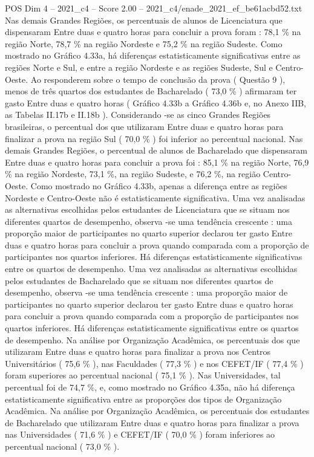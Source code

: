 \begin{textsample}{POS Dim 4 – 2021\_c4 – Score 2.00 – 2021\_c4/enade\_2021\_ef\_be61acbd52.txt}
Nas demais Grandes Regiões, os percentuais de alunos de Licenciatura que dispensaram Entre duas e quatro horas para concluir a prova foram : 78,1 \% na região Norte, 78,7 \% na região Nordeste e 75,2 \% na região Sudeste.
Como mostrado no Gráfico 4.33a, há diferenças estatisticamente significativas entre as regiões Norte e Sul, e entre a região Nordeste e as regiões Sudeste, Sul e Centro-Oeste.
Ao responderem sobre o tempo de conclusão da prova ( Questão 9 ), menos de três quartos dos estudantes de Bacharelado ( 73,0 \% ) afirmaram ter gasto Entre duas e quatro horas ( Gráfico 4.33b a Gráfico 4.36b e, no Anexo IIB, as Tabelas II.17b e II.18b ).
Considerando -se as cinco Grandes Regiões brasileiras, o percentual dos que utilizaram Entre duas e quatro horas para finalizar a prova na região Sul ( 70,0 \% ) foi inferior ao percentual nacional.
Nas demais Grandes Regiões, o percentual de alunos de Bacharelado que dispensaram Entre duas e quatro horas para concluir a prova foi : 85,1 \% na região Norte, 76,9 \% na região Nordeste, 73,1 \%, na região Sudeste, e 76,2 \%, na região Centro-Oeste.
Como mostrado no Gráfico 4.33b, apenas a diferença entre as regiões Nordeste e Centro-Oeste não é estatisticamente significativa.
Uma vez analisadas as alternativas escolhidas pelos estudantes de Licenciatura que se situam nos diferentes quartos de desempenho, observa -se uma tendência crescente : uma proporção maior de participantes no quarto superior declarou ter gasto Entre duas e quatro horas para concluir a prova quando comparada com a proporção de participantes nos quartos inferiores.
Há diferenças estatisticamente significativas entre os quartos de desempenho.
Uma vez analisadas as alternativas escolhidas pelos estudantes de Bacharelado que se situam nos diferentes quartos de desempenho, observa -se uma tendência crescente : uma proporção maior de participantes no quarto superior declarou ter gasto Entre duas e quatro horas para concluir a prova quando comparada com a proporção de participantes nos quartos inferiores.
Há diferenças estatisticamente significativas entre os quartos de desempenho.
Na análise por Organização Acadêmica, os percentuais dos que utilizaram Entre duas e quatro horas para finalizar a prova nos Centros Universitários ( 75,6 \% ), nas Faculdades ( 77,3 \% ) e nos CEFET/IF ( 77,4 \% ) foram superiores ao percentual nacional ( 75,1 \% ).
Nas Universidades, tal percentual foi de 74,7 \%, e, como mostrado no Gráfico 4.35a, não há diferença estatisticamente significativa entre as proporções dos tipos de Organização Acadêmica.
Na análise por Organização Acadêmica, os percentuais dos estudantes de Bacharelado que utilizaram Entre duas e quatro horas para finalizar a prova nas Universidades ( 71,6 \% ) e CEFET/IF ( 70,0 \% ) foram inferiores ao percentual nacional ( 73,0 \% ).

\end{textsample}
